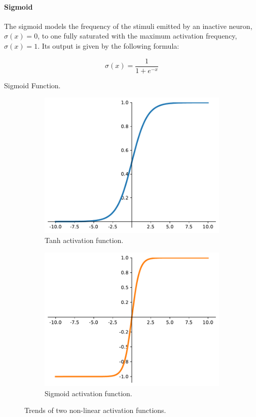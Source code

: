\paragraph*{Sigmoid}
The sigmoid models the frequency of the stimuli emitted by an inactive neuron, 
$\sigma(x)=0$, to one fully saturated with the maximum activation frequency, 
$\sigma(x)=1$. Its  output is given by the following formula:
\begin{Equation}[H]
	\centering
	\begin{equation}
	\sigma(x)= \frac{1}{1 + e^{-x}}
	\end{equation}
	\caption{Sigmoid Function.}
	\label{eq:sigmoid}
\end{Equation}

\begin{figure}[!htb]
	\begin{center}
		\begin{subfigure}[h]{0.495\textwidth}
			\includegraphics[width=.8\textwidth]{contents/images/sigmoid2}
			\caption{Tanh activation function.}
		\end{subfigure}
		\hfill
		\begin{subfigure}[h]{0.495\textwidth}
			\includegraphics[width=.8\textwidth]{contents/images/tanh2}
			\caption{Sigmoid activation function.}
		\end{subfigure}
	\end{center}
	\caption{Trends of two non-linear activation functions.}
	\label{fig:activation}
\end{figure}

